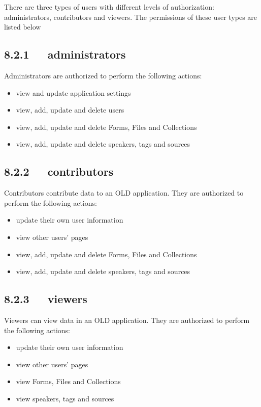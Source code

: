 \documentclass[letterpaper,10pt,english]{sphinxmanual}
\begin{document}
There are three types of users with different levels of authorization:
administrators, contributors and viewers.  The permissions of these user types
are listed below


\subsection{8.2.1   administrators}
\label{user_guide:administrators}
Administrators are authorized to perform the following actions:
\begin{itemize}
\item {} 
view and update application settings

\item {} 
view, add, update and delete users

\item {} 
view, add, update and delete Forms, Files and Collections

\item {} 
view, add, update and delete speakers, tags and sources

\end{itemize}


\subsection{8.2.2   contributors}
\label{user_guide:contributors}
Contributors contribute data to an OLD application.  They are authorized to
perform the following actions:
\begin{itemize}
\item {} 
update their own user information

\item {} 
view other users' pages

\item {} 
view, add, update and delete Forms, Files and Collections

\item {} 
view, add, update and delete speakers, tags and sources

\end{itemize}


\subsection{8.2.3   viewers}
\label{user_guide:viewers}
Viewers can view data in an OLD application.  They are authorized to perform
the following actions:
\begin{itemize}
\item {} 
update their own user information

\item {} 
view other users' pages

\item {} 
view Forms, Files and Collections

\item {} 
view speakers, tags and sources

\end{itemize}
\end{document}
